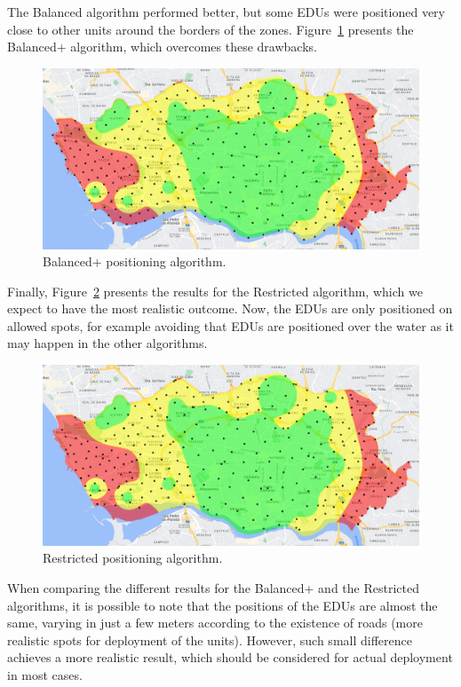 \begin{refsection}
The Balanced algorithm performed better, but some EDUs were positioned very close to other units around the borders of the zones. Figure~\ref{Fig:edus_enhanced} presents the Balanced+ algorithm, which overcomes these drawbacks.

\begin{figure}[htbp!]
  \centering
  \includegraphics[width=0.9\linewidth]{Chapters/2-EDUs/images/porto_M3_balanced_plus.png}
  \caption{Balanced+ positioning algorithm.}\label{Fig:edus_enhanced}
\end{figure}

Finally, Figure~\ref{Fig:edus_restricted} presents the results for the Restricted algorithm, which we expect to have the most realistic outcome. Now, the EDUs are only positioned on allowed spots, for example avoiding that EDUs are positioned over the water as it may happen in the other algorithms.  

\begin{figure}[htbp!]
  \centering
  \includegraphics[width=0.9\linewidth]{Chapters/2-EDUs/images/porto_M3_restricted.png}
  \caption{Restricted positioning algorithm.}\label{Fig:edus_restricted}
\end{figure}

When comparing the different results for the Balanced+ and the Restricted algorithms, it is possible to note that the positions of the EDUs are almost the same, varying in just a few meters according to the existence of roads (more realistic spots for deployment of the units). However, such small difference achieves a more realistic result, which should be considered for actual deployment in most cases.


\end{refsection}
